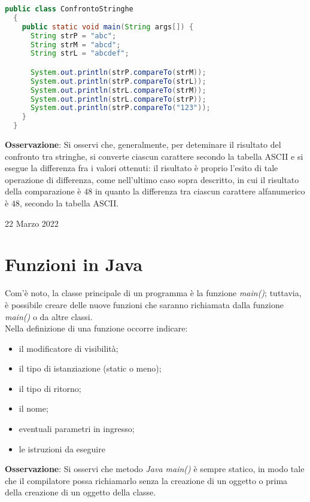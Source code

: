 \documentclass[a4paper]{extarticle}
\begin{document}
\newpage
\noindent
\begin{lstlisting}[language=Java, caption=Confronto fra stringhe in Java]
  public class ConfrontoStringhe
  {
    public static void main(String args[]) {
      String strP = "abc";
      String strM = "abcd";
      String strL = "abcdef";

      System.out.println(strP.compareTo(strM));
      System.out.println(strP.compareTo(strL));
      System.out.println(strL.compareTo(strM));
      System.out.println(strL.compareTo(strP));
      System.out.println(strP.compareTo("123"));
    }
  }
\end{lstlisting}

\vspace{1em}
\noindent
\textbf{Osservazione}: Si osservi che, generalmente, per deteminare il risultato del confronto tra stringhe, si converte ciascun carattere secondo la tabella ASCII e si esegue la differenza fra i valori ottenuti: il risultato è proprio l'esito di tale operazione di differenza, come nell'ultimo caso sopra descritto, in cui il risultato della comparazione è $48$ in quanto la differenza tra ciascun carattere alfanumerico è $48$, secondo la tabella ASCII.

\newpage
\noindent
\begin{center}
  22 Marzo 2022
\end{center}
\section{Funzioni in Java}
Com'è noto, la classe principale di un programma è la funzione \emph{main()}; tuttavia, è possibile creare delle nuove funzioni che saranno richiamata dalla funzione \emph{main()} o da altre classi.\\
Nella definizione di una funzione occorre indicare:
\begin{itemize}
  \item il modificatore di visibilità;
  \item il tipo di istanziazione (static o meno);
  \item il tipo di ritorno;
  \item il nome;
  \item eventuali parametri in ingresso;
  \item le istruzioni da eseguire
\end{itemize}

\vspace{1em}
\noindent
\textbf{Osservazione}: Si osservi che metodo \emph{Java main()} è sempre statico, in modo tale che il compilatore possa richiamarlo senza la creazione di un oggetto o prima della creazione di un oggetto della classe.
\end{document}
